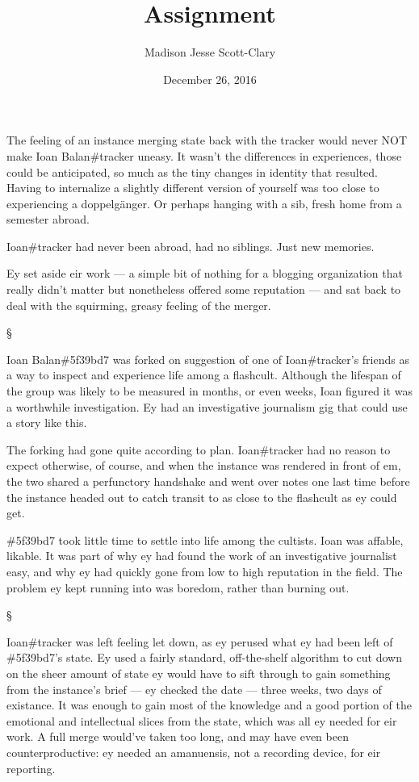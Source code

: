 \documentclass[12pt,letterpaper,oneside]{memoir}
\title{Assignment}
\author{Madison Jesse Scott-Clary}
\date{December 26, 2016}
\newcommand\secdiv{
  \begin{center}
    \S
  \end{center}
}
\begin{document}
  \maketitle

  The feeling of an instance merging state back with the tracker would never NOT make Ioan Balan\#tracker uneasy. It wasn't the differences in experiences, those could be anticipated, so much as the tiny changes in identity that resulted. Having to internalize a slightly different version of yourself was too close to experiencing a doppelg\"{a}nger. Or perhaps hanging with a sib, fresh home from a semester abroad.

  Ioan\#tracker had never been abroad, had no siblings. Just new memories.

  Ey set aside eir work --- a simple bit of nothing for a blogging organization that really didn't matter but nonetheless offered some reputation --- and sat back to deal with the squirming, greasy feeling of the merger.

  \secdiv

  Ioan Balan\#5f39bd7 was forked on suggestion of one of Ioan\#tracker's friends as a way to inspect and experience life among a flashcult. Although the lifespan of the group was likely to be measured in months, or even weeks, Ioan figured it was a worthwhile investigation. Ey had an investigative journalism gig that could use a story like this.

  The forking had gone quite according to plan. Ioan\#tracker had no reason to expect otherwise, of course, and when the instance was rendered in front of em, the two shared a perfunctory handshake and went over notes one last time before the instance headed out to catch transit to as close to the flashcult as ey could get.

  \#5f39bd7 took little time to settle into life among the cultists. Ioan was affable, likable. It was part of why ey had found the work of an investigative journalist easy, and why ey had quickly gone from low to high reputation in the field. The problem ey kept running into was boredom, rather than burning out.

  \secdiv

  Ioan\#tracker was left feeling let down, as ey perused what ey had been left of \#5f39bd7's state. Ey used a fairly standard, off-the-shelf algorithm to cut down on the sheer amount of state ey would have to sift through to gain something from the instance's brief --- ey checked the date --- three weeks, two days of existance. It was enough to gain most of the knowledge and a good portion of the emotional and intellectual slices from the state, which was all ey needed for eir work. A full merge would've taken too long, and may have even been counterproductive: ey needed an amanuensis, not a recording device, for eir reporting.
\end{document}
